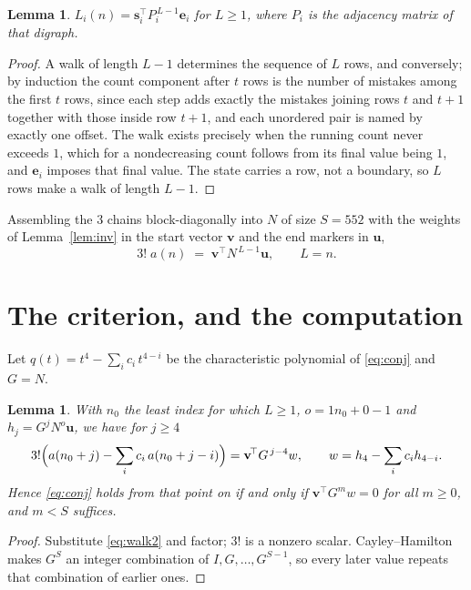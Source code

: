 \documentclass[11pt,a4paper]{article}
\theoremstyle{plain}
\newtheorem{lemma}[theorem]{Lemma}
\theoremstyle{definition}
\begin{document}
\begin{lemma}\label{lem:walk}
$L_i(n)=\mathbf{s}_i^{\!\top}P_i^{\,L-1}\mathbf{e}_i$ for $L\ge1$, where $P_i$ is the
adjacency matrix of that digraph.
\end{lemma}

\begin{proof}
A walk of length $L-1$ determines the sequence of $L$ rows, and conversely; by induction
the count component after $t$ rows is the number of mistakes among the first $t$ rows,
since each step adds exactly the mistakes joining rows $t$ and $t+1$ together with those
inside row $t+1$, and each unordered pair is named by exactly one offset. The walk exists
precisely when the running count never exceeds $1$, which for a nondecreasing count follows
from its final value being $1$, and $\mathbf{e}_i$ imposes that final value. The state
carries a row, not a boundary, so $L$ rows make a walk of length $L-1$.
\end{proof}

Assembling the $3$ chains block-diagonally into $N$ of size $S=552$ with the weights of
Lemma~\ref{lem:inv} in the start vector $\mathbf{v}$ and the end markers in
$\mathbf{u}$,
\begin{equation}\label{eq:walk2}
3!\;a(n)\;=\;\mathbf{v}^{\!\top}N^{\,L-1}\mathbf{u},\qquad L=n .
\end{equation}

\section{The criterion, and the computation}

Let $q(t)=t^{4}-\sum_i c_i\,t^{4-i}$ be the characteristic polynomial of
\eqref{eq:conj} and $G=N$.

\begin{lemma}\label{lem:crit}
With $n_0$ the least index for which $L\ge1$, $o=1n_0+0-1$ and
$h_j=G^{j}N^{o}\mathbf{u}$, we have for $j\ge4$
\[
3!\Bigl(a(n_0+j)-\sum_i c_i\,a(n_0+j-i)\Bigr)=\mathbf{v}^{\!\top}G^{\,j-4}w,
\qquad w=h_{4}-\sum_i c_ih_{4-i} .
\]
Hence \eqref{eq:conj} holds from that point on if and only if
$\mathbf{v}^{\!\top}G^{m}w=0$ for all $m\ge0$, and $m<S$ suffices.
\end{lemma}

\begin{proof}
Substitute \eqref{eq:walk2} and factor; $3!$ is a nonzero scalar. Cayley--Hamilton
makes $G^{S}$ an integer combination of $I,G,\dots,G^{S-1}$, so every later value repeats
that combination of earlier ones.
\end{proof}
\end{document}
